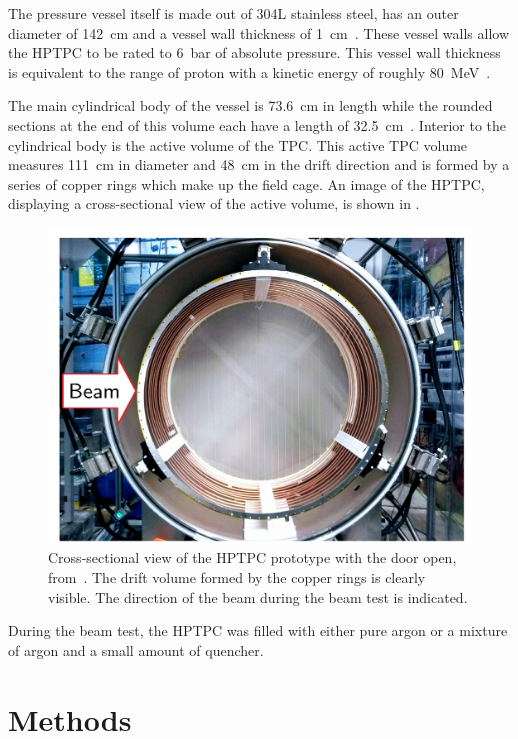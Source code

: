 The pressure vessel itself is made out of 304L stainless steel, has an outer diameter of \SI{142}{\centi\metre} and a vessel wall thickness of \SI{1}{\centi\metre}~\cite{deisting2021high}.
These vessel walls allow the HPTPC to be rated to 6~bar of absolute pressure.
This vessel wall thickness is equivalent to the range of proton with a kinetic energy of roughly \SI{80}{\mega\electronvolt}~\cite{protonRangeTables}.

The main cylindrical body of the vessel is \SI{73.6}{\centi\metre} in length while the rounded sections at the end of this volume each have a length of \SI{32.5}{\centi\metre}~\cite{deisting2021high}.
Interior to the cylindrical body is the active volume of the TPC.
This active TPC volume measures \SI{111}{\centi\metre} in diameter and \SI{48}{\centi\metre} in the drift direction and is formed by a series of copper rings which make up the field cage.
An image of the HPTPC, displaying a cross-sectional view of the active volume, is shown in .

\begin{figure}[h]
  \centering
  \includegraphics[width=.7\linewidth]{files/figures/hptpc_beam_flux/vesselView}
  \caption[Cross-sectional view of the HPTPC prototype.]{Cross-sectional view of the HPTPC prototype with the door open, from~\cite{beampaper}. The drift volume formed by the copper rings is clearly visible. The direction of the beam during the beam test is indicated.}
  \label{fig:hptpc}
\end{figure}

During the beam test, the HPTPC was filled with either pure argon or a mixture of argon and a small amount of quencher.

\section{Methods}
\label{sec:hptpc_beam_flux:methods}

